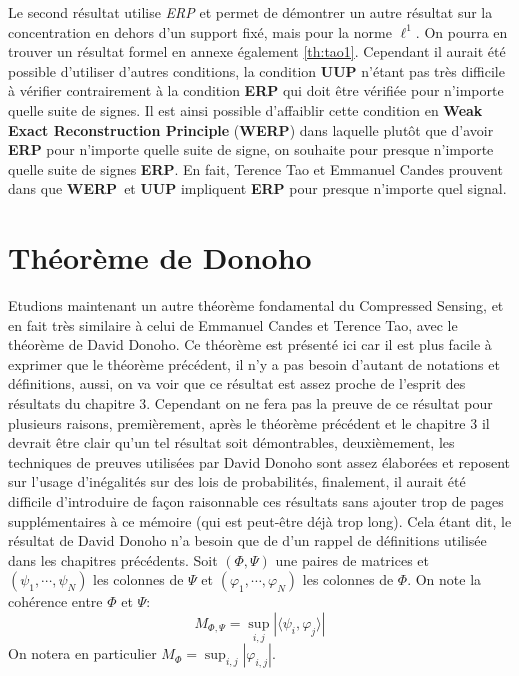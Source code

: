 \newline
Le second résultat utilise \emph{ERP} et permet de démontrer un autre résultat sur la concentration en dehors d'un support fixé, mais pour la norme $\ell^1$. On pourra en trouver un résultat formel en annexe également \ref{th:tao1}.
\newline
Cependant il aurait été possible d'utiliser d'autres conditions, la condition \textbf{UUP} n'étant pas très difficile à vérifier contrairement à la condition \textbf{ERP} qui doit être vérifiée pour n'importe quelle suite de signes. 
Il est ainsi possible d'affaiblir cette condition en \textbf{Weak Exact Reconstruction Principle} (\textbf{WERP}) dans laquelle plutôt que d'avoir \textbf{ERP} pour n'importe quelle suite de signe, on souhaite pour presque n'importe quelle suite de signes \textbf{ERP}. 
En fait, Terence Tao et Emmanuel Candes prouvent dans \cite{CT} que \textbf{WERP} et \textbf{UUP} impliquent \textbf{ERP} pour presque n'importe quel signal.
\section{Théorème de Donoho}
Etudions maintenant un autre théorème fondamental du Compressed Sensing, et en fait très similaire à celui de Emmanuel Candes et Terence Tao, avec le théorème de David Donoho.
Ce théorème est présenté ici car il est plus facile à exprimer que le théorème précédent, il n'y a pas besoin d'autant de notations et définitions, aussi, on va voir que ce résultat est assez proche de l'esprit des résultats du chapitre 3.
Cependant on ne fera pas la preuve de ce résultat pour plusieurs raisons, premièrement, après le théorème précédent et le chapitre 3 il devrait être clair qu'un tel résultat soit démontrables, deuxièmement, les techniques de preuves utilisées par David Donoho sont assez élaborées et reposent sur l'usage d'inégalités sur des lois de probabilités, finalement, il aurait été difficile d'introduire de façon raisonnable ces résultats sans ajouter trop de pages supplémentaires à ce mémoire (qui est peut-être déjà trop long).
\newline
Cela étant dit, le résultat de David Donoho n'a besoin que de d'un rappel de définitions utilisée dans les chapitres précédents.
Soit $(\Phi, \Psi)$ une paires de matrices et $(\psi_1, \cdots, \psi_N)$ les colonnes de $\Psi$ et $(\varphi_1, \cdots, \varphi_N)$ les colonnes de $\Phi$.
On note la cohérence entre $\Phi$ et $\Psi$:
\begin{equation}
	M_{\Phi, \Psi} = \sup_{i,j}|\langle \psi_i, \varphi_j \rangle|
\end{equation}
On notera en particulier $M_\Phi = \sup_{i,j} |\varphi_{i,j}|$.

